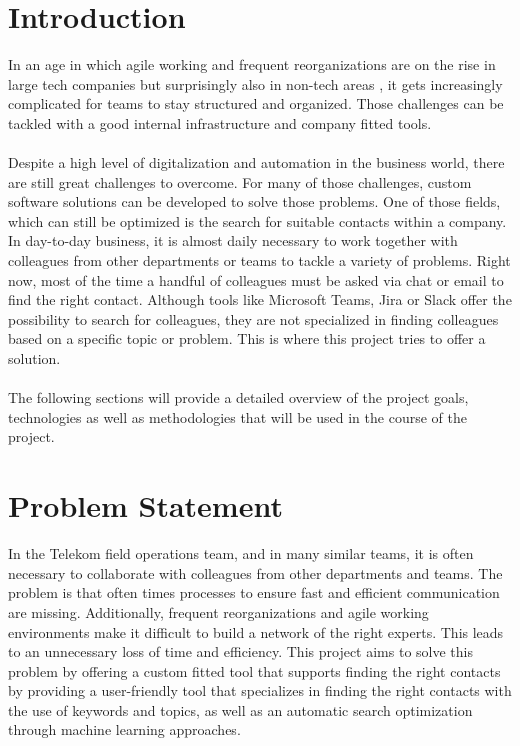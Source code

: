 \newpage
\section{Introduction}
In an age in which agile working and frequent reorganizations are on the rise 
in large tech companies but surprisingly also in non-tech areas \cite{noauthor_orgs_nodate}, it gets increasingly complicated for teams to stay structured 
and organized. Those challenges can be tackled with a good internal infrastructure 
and company fitted tools.
\\
\\
Despite a high level of digitalization and automation in the business world, there are still 
great challenges to overcome. For many of those challenges, custom software solutions can 
be developed to solve those problems. One of those fields, which can still be optimized is 
the search for suitable contacts within a company. In day-to-day business, it is almost 
daily necessary to work together with colleagues from other departments or teams to tackle 
a variety of problems. Right now, most of the time a handful of colleagues must be asked
via chat or email to find the right contact. Although tools like Microsoft Teams, Jira or 
Slack offer the possibility to search for colleagues, they are not specialized in finding colleagues
based on a specific topic or problem. This is where this project tries to offer a solution.\\
\\
The following sections will provide a detailed overview of the project goals, technologies as 
well as methodologies that will be used in the course of the project.

\section{Problem Statement}
In the Telekom field operations team, and in many similar teams, it is often necessary to collaborate
with colleagues from other departments and teams. The problem is that often times processes to ensure 
fast and efficient communication are missing. Additionally, frequent reorganizations and agile working 
environments make it difficult to build a network of the right experts. This leads to an unnecessary
loss of time and efficiency. This project aims to solve this problem by offering a custom fitted tool
that supports finding the right contacts by providing a user-friendly tool that specializes in finding 
the right contacts with the use of keywords and topics, as well as an automatic search optimization through
machine learning approaches.

